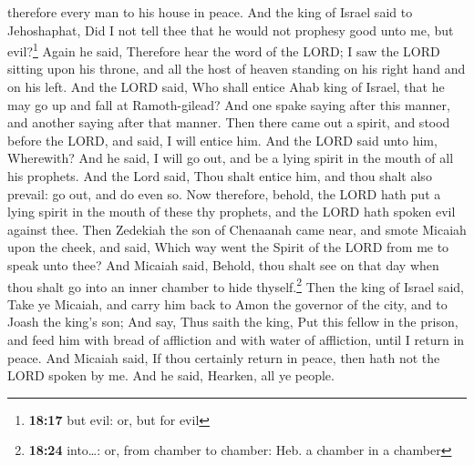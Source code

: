 therefore every man to his house in peace.  And the king
of Israel said to Jehoshaphat, Did I not tell thee that he would not
prophesy good unto me, but evil?\footnote{\textbf{18:17} but evil: or,
  but for evil}  Again he said, Therefore hear the word
of the LORD; I saw the LORD sitting upon his throne, and all the host of
heaven standing on his right hand and on his left.  And
the LORD said, Who shall entice Ahab king of Israel, that he may go up
and fall at Ramoth-gilead? And one spake saying after this manner, and
another saying after that manner.  Then there came out a
spirit, and stood before the LORD, and said, I will entice him. And the
LORD said unto him, Wherewith?  And he said, I will go
out, and be a lying spirit in the mouth of all his prophets. And the
Lord said, Thou shalt entice him, and thou shalt also prevail: go out,
and do even so.  Now therefore, behold, the LORD hath put
a lying spirit in the mouth of these thy prophets, and the LORD hath
spoken evil against thee.  Then Zedekiah the son of
Chenaanah came near, and smote Micaiah upon the cheek, and said, Which
way went the Spirit of the LORD from me to speak unto thee?
 And Micaiah said, Behold, thou shalt see on that day
when thou shalt go into an inner chamber to hide thyself.\footnote{\textbf{18:24}
  into\ldots: or, from chamber to chamber: Heb. a chamber in a chamber}
 Then the king of Israel said, Take ye Micaiah, and carry
him back to Amon the governor of the city, and to Joash the king's son;
 And say, Thus saith the king, Put this fellow in the
prison, and feed him with bread of affliction and with water of
affliction, until I return in peace.  And Micaiah said,
If thou certainly return in peace, then hath not the LORD spoken by me.
And he said, Hearken, all ye people.

